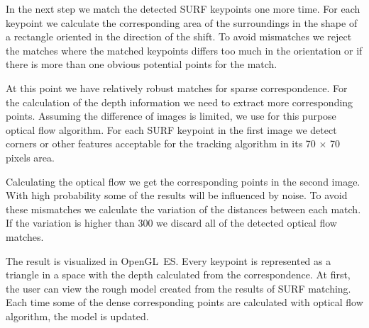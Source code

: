 In the next step we match the detected SURF keypoints one more time.
For each keypoint we calculate the corresponding area of the surroundings in the shape of a rectangle oriented in the direction of the shift. 
To avoid mismatches we reject the matches where the matched keypoints differs too much in the orientation or if there is more than one obvious potential points for the match.



At this point we have relatively robust matches for sparse correspondence. 
For the calculation of the depth information we need to extract more corresponding points.
Assuming the difference of images is limited, we use for this purpose optical flow algorithm. 
For each SURF keypoint in the first image we detect corners or other features acceptable for the tracking algorithm in its 70 $\times$ 70 pixels area.


Calculating the optical flow we get the corresponding points in the second image.
With high probability some of the results will be influenced by noise.
To avoid these mismatches we calculate the variation of the distances between each match.
If the variation is higher than 300 we discard all of the detected optical flow matches.

The result is visualized in OpenGL~ES.
Every keypoint is represented as a triangle in a space with the depth calculated from the correspondence.
At first, the user can view the rough model created from the results of SURF matching.
Each time some of the dense corresponding points are calculated with optical flow algorithm, the model is updated.


